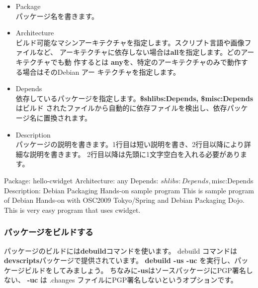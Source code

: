 \documentclass[mingoth,a4paper]{jsarticle}
\begin{document}
\begin{itemize}

\item Package \\
パッケージ名を書きます。

\item Architecture \\
ビルド可能なマシンアーキテクチャを指定します。スクリプト言語や画像ファイルなど、
アーキテクチャに依存しない場合は{\bf all}を指定します。どのアーキテクチャでも動
作するとは {\bf any}を、特定のアーキテクチャのみで動作する場合はそのDebian アー
キテクチャを指定します。

\item Depends \\
依存しているパッケージを指定します。{\bf \${shlibs:Depends}, \${misc:Depends}} はビルド
されたファイルから自動的に依存ファイルを検出し、依存パッケージ名に置換されます。

\item Description \\
パッケージの説明を書きます。1行目は短い説明を書き、2行目以降により詳細な説明を書きます。
2行目以降は先頭に1文字空白を入れる必要があります。

\end{itemize}

\begin{commandline}
Package: hello-cwidget
Architecture: any
Depends: ${shlibs:Depends}, ${misc:Depends}
Description: Debian Packaging Hands-on sample program
 This is sample program of Debian Hands-on with OSC2009
 Tokyo/Spring and Debian Packaging Dojo.
 This is very easy program that uses cwidget.
\end{commandline}

\subsubsection{パッケージをビルドする}

パッケージのビルドには{\bf debuild}コマンドを使います。
debuild コマンドは{\bf devscripts}パッケージで提供されています。
{\bf debuild -us -uc} を実行し、パッケージビルドをしてみましょう。
ちなみに{\bf -us}はソースパッケージにPGP署名しない、
{\bf -uc} は .changes ファイルにPGP署名しないというオプションです。

\end{document}

